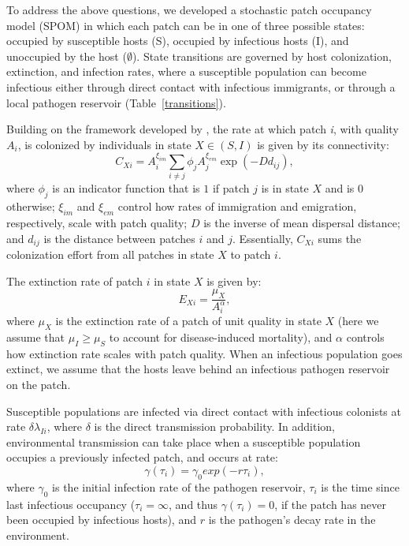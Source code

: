 \documentclass{article}
\begin{document}
To address the above questions, we developed a stochastic patch occupancy model (SPOM) in which each patch can be in one of three possible states: occupied by susceptible hosts (S), occupied by infectious hosts (I), and unoccupied by the host ($\emptyset$).  State transitions are governed by host colonization, extinction, and infection rates, where a susceptible population can become infectious either through direct contact with infectious immigrants, or through a local pathogen reservoir (Table~\ref{transitions}).

Building on the framework developed by \cite{Hanski2003}, the rate at which patch \emph{i}, with quality $A_i$, is colonized by individuals in state $X \in (S,I)$ is given by its connectivity:
\begin{equation}
C_{Xi}=A_i^{\xi_{im}} \sum_{i\neq j }\phi_jA_j^{\xi_{em}}\exp(-D d_{ij}),
\label{connectivity}
\end{equation}
where $\phi_j$ is an indicator function that is $1$ if patch $j$ is in state $X$ and is $0$ otherwise; $\xi_{im}$ and $\xi_{em}$ control how rates of immigration and emigration, respectively, scale with patch quality; $D$ is the inverse of mean dispersal distance; and $d_{ij}$ is the distance between patches $i$ and $j$.  Essentially, $C_{Xi}$ sums the colonization effort from all patches in state $X$ to patch $i$.  

The extinction rate of patch $i$ in state $X$ is given by:
\begin{equation}
E_{Xi}=\frac{\mu_X}{A_i^\alpha},
\end{equation}
where $\mu_X$ is the extinction rate of a patch of unit quality in state $X$ (here we assume that $\mu_I \geq \mu_S$ to account for disease-induced mortality), and $\alpha$ controls how extinction rate scales with patch quality.  When an infectious population goes extinct, we assume that the hosts leave behind an infectious pathogen reservoir on the patch.  

Susceptible populations are infected via direct contact with infectious colonists at rate $\delta \lambda_{Ii}$, where $\delta$ is the direct transmission probability.  In addition, environmental transmission can take place when a susceptible population occupies a previously infected patch, and occurs at rate:
\begin{equation}
\gamma(\tau_i)=\gamma_0exp(-r\tau_{i}),
\end{equation}
where $\gamma_0$ is the initial infection rate of the pathogen reservoir, $\tau_{i}$ is the time since last infectious occupancy ($\tau_{i} = \infty$, and thus $\gamma(\tau_i) = 0$, if the patch has never been occupied by infectious hosts), and $r$ is the pathogen's decay rate in the environment.
\end{document}
